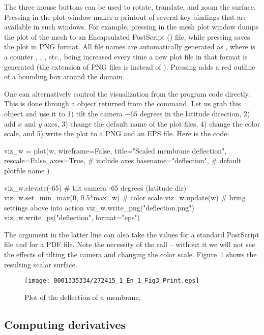 The three mouse buttons can be used to rotate, translate, and zoom
the surface.  Pressing  in the plot window makes a printout of
several key bindings that are available in such windows. For example,
pressing  in the mesh plot window dumps the plot of the mesh to an
Encapsulated PostScript () file, while pressing  saves
the plot in PNG format.  All file names are automatically generated as
, where  is a counter , ,
, etc., being increased every time a new plot file in that
format is generated (the extension of PNG files is  instead
of ).  Pressing  adds a red outline of a bounding box
around the domain.


One can alternatively control the visualization from the program code
directly. This is done through a  object returned from the
 command. Let us grab this object and use it to 1) tilt the
camera $-65$ degrees in the latitude direction,\vadjust{\pagebreak} 2) add $x$ and $y$ axes, 3)
change the default name of the plot files, 4) change the color scale, and 5)
write the plot to a PNG and an EPS file. Here is the code:
\begin{python}
viz_w = plot(w,
            wireframe=False,
            title="Scaled membrane deflection",
            rescale=False,
            axes=True,              # include axes
            basename="deflection",  # default plotfile name
            )

viz_w.elevate(-65) # tilt camera -65 degrees (latitude dir)
viz_w.set_min_max(0, 0.5*max_w)  # color scale
viz_w.update(w)    # bring settings above into action
viz_w.write_png("deflection.png")
viz_w.write_ps("deflection", format="eps")
\end{python}
The  argument in the latter line can also take the values
 for a standard PostScript file and  for a PDF file.
Note the necessity of the  call -- without it we
will not see the effects of tilting the camera and changing the color
scale. Figure~\ref{langtangen:poisson:2D:fig1} shows the resulting
scalar surface.

\begin{figure}[!b]
  \centering
  \texttt{[image: 0001335334/272415\_1\_En\_1\_Fig3\_Print.eps]}
  \caption{Plot of the deflection of a membrane.}
  \label{langtangen:poisson:2D:fig1}
\end{figure}

\subsection{Computing derivatives}
\label{langtangen:poisson:gradu}

